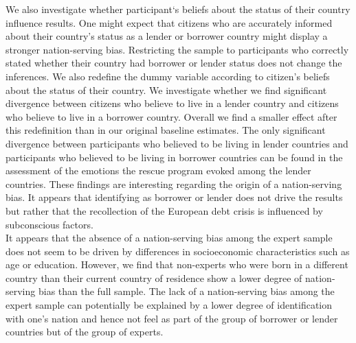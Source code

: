 We also investigate whether participant`s beliefs about the status of their country influence results. One might expect that citizens who are accurately informed about their country's status as a lender or borrower country might display a stronger nation-serving bias. Restricting the sample to participants who correctly stated whether their country had borrower or lender status does not change the inferences. We also redefine the dummy variable according to citizen's beliefs about the status of their country. We investigate whether we find significant divergence between citizens who believe to live in a lender country and citizens who believe to live in a borrower country. Overall we find a smaller effect after this redefinition than in our original baseline estimates. The only significant divergence between participants who believed to be living in lender countries and participants who believed to be living in borrower countries can be found in the assessment of the emotions the rescue program evoked among the lender countries. These findings are interesting regarding the origin of a nation-serving bias. It appears that identifying as borrower or lender does not drive the results but rather that the recollection of the European debt crisis is influenced by subconscious factors. 
\\
It appears that the absence of a nation-serving bias among the expert sample does not seem to be driven by differences in socioeconomic characteristics such as age or education.  However, we find that non-experts who were born in a different country than their current country of residence show a lower degree of nation-serving bias than the full sample. The lack of  a nation-serving bias among the expert sample can potentially be explained by a lower degree of identification with one's nation and hence not feel as part of the group of borrower or lender countries but of the group of experts. 

